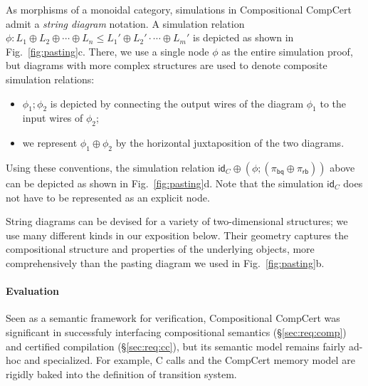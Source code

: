 \documentclass[acmsmall,screen,review,anonymous]{acmart}
\newcommand{\kw}[1]{\ensuremath{ \mathsf{#1} }}
\begin{document}
As morphisms of a monoidal category,
simulations in Compositional CompCert
admit a \emph{string diagram} notation.
A simulation relation
$
  \phi : L_1 \oplus L_2 \oplus \cdots \oplus L_n \le
        L_1' \oplus L_2' \cdot \cdots \oplus L_m'
$
is depicted as shown in Fig.~\ref{fig:pasting}c.
There, we use a single node $\phi$
as the entire simulation proof,
but diagrams with more complex structures
are used to denote composite simulation relations:
\begin{itemize}
\item
$\phi_1 \mathbin; \phi_2$
is depicted
by connecting the output wires of
the diagram $\phi_1$
to the input wires of $\phi_2$;
\item
we represent
$\phi_1 \oplus \phi_2$
by the horizontal juxtaposition of the two diagrams.
\end{itemize}
Using these conventions,
the simulation relation
$\kw{id}_C \oplus (\phi \mathbin; (\pi_\kw{bq} \oplus \pi_\kw{rb}))$
above can be depicted
as shown in Fig.~\ref{fig:pasting}d.
Note that the simulation $\kw{id}_C$
does not have to be represented as an explicit node.

String diagrams can be devised for a variety of 
two-dimensional structures;
we use many different kinds in our exposition below.
Their geometry
captures the compositional structure and properties
of the underlying objects,
more comprehensively %
than the pasting diagram
we used in Fig.~\ref{fig:pasting}b.


\paragraph{Evaluation} %


Seen as a semantic framework for verification,
Compositional CompCert
was significant in successfuly interfacing
compositional semantics (\S\ref{sec:req:comp}) and
certified compilation (\S\ref{sec:req:cc}),
but its semantic model
remains fairly ad-hoc and specialized.
For example,
C calls and the CompCert memory model
are rigidly baked into the definition of transition system.
\end{document}
